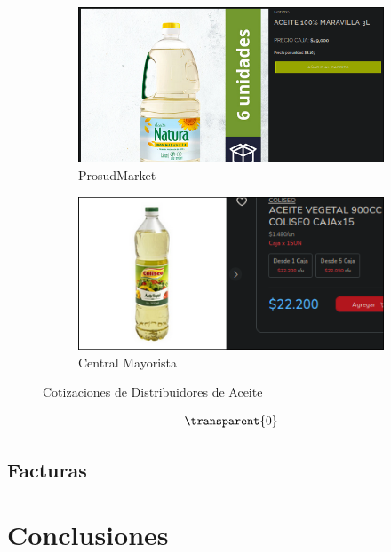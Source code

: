 \documentclass[12pt]{article}
\begin{document}
        \begin{figure}[h!] %
            \centering
            \begin{subfigure}{0.45\textwidth}
                \centering
                \includegraphics[width=0.9\linewidth]{prosud} %
                \caption{ProsudMarket}
                \label{fig:prosudmarket}
            \end{subfigure}
            \hfill
            \begin{subfigure}{0.45\textwidth}
                \centering
                \includegraphics[width=0.9\linewidth]{aceite} %
                \caption{Central Mayorista}
                \label{fig:central_mayorista_aceite}
            \end{subfigure}
            \caption{Cotizaciones de Distribuidores de Aceite}
            \label{fig:cotizaciones_aceite}
        \end{figure} %
        
        \newpage %
        \[\transparent{0}\]
    \subsection{Facturas}
    \newpage


\section{Conclusiones} %
\end{document}
